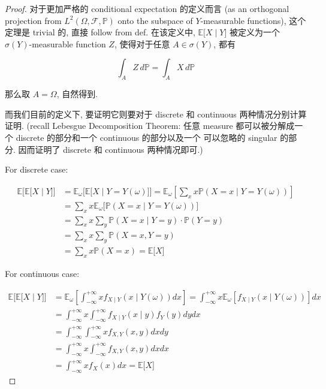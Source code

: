 \documentclass{qlnotes-export}
\begin{document}
\begin{proof}

对于更加严格的 conditional expectation 的定义而言 (as an orthogonal projection from \(L^{2}(\Omega,\mathcal{F},{\mathbb{P}})\) onto the subspace of \(Y\)-measurable functions), 这个定理是 trivial 的, 直接 follow from def. 在该定义中, \(\left. {\mathbb{E}}\lbrack X \middle| Y\rbrack \right.\) 被定义为一个 \(\sigma(Y)\)-measurable function \(Z\), 使得对于任意 \(A \in \sigma(Y)\), 都有

\[\int_{A}Z\, d{\mathbb{P}} = \int_{A}X\, d{\mathbb{P}}\]

那么取 \(A = \Omega\), 自然得到.

而我们目前的定义下, 要证明它则要对于 discrete 和 continuous 两种情况分别计算证明. (recall Lebesgue Decomposition Theorem: 任意 measure 都可以被分解成一个 discrete 的部分和一个 continuous 的部分以及一个 可以忽略的 singular 的部分. 因而证明了 discrete 和 continuous 两种情况即可.)

For discrete case:

\[\begin{matrix}
{{\mathbb{E}}\lbrack{\mathbb{E}}\lbrack X \mid Y\rbrack\rbrack} & {= {\mathbb{E}}_{\omega}\lbrack{\mathbb{E}}\lbrack X \mid Y = Y(\omega)\rbrack\rbrack = {\mathbb{E}}_{\omega}\left\lbrack {\sum\limits_{x}x{\mathbb{P}}(X = x \mid Y = Y(\omega))} \right\rbrack} \\
 & {= \sum\limits_{x}x{\mathbb{E}}_{\omega}\lbrack{\mathbb{P}}(X = x \mid Y = Y(\omega))\rbrack} \\
 & {= \sum\limits_{x}x\sum\limits_{y}{\mathbb{P}}(X = x \mid Y = y) \cdot {\mathbb{P}}(Y = y)} \\
 & {= \sum\limits_{x}x\sum\limits_{y}{\mathbb{P}}(X = x,Y = y)} \\
 & {= \sum\limits_{x}x{\mathbb{P}}(X = x) = {\mathbb{E}}\lbrack X\rbrack}
\end{matrix}\]

For continuous case:

\[\begin{matrix}
{{\mathbb{E}}\lbrack{\mathbb{E}}\lbrack X \mid Y\rbrack\rbrack} & {= {\mathbb{E}}_{\omega}\left\lbrack {\int_{- \infty}^{+ \infty}xf_{X \mid Y}(x \mid Y(\omega))dx} \right\rbrack = \int_{- \infty}^{+ \infty}x{\mathbb{E}}_{\omega}\left\lbrack {f_{X \mid Y}(x \mid Y(\omega))} \right\rbrack dx} \\
 & {= \int_{- \infty}^{+ \infty}x\int_{- \infty}^{+ \infty}f_{X \mid Y}(x \mid y)f_{Y}(y)dydx} \\
 & {= \int_{- \infty}^{+ \infty}\int_{- \infty}^{+ \infty}xf_{X,Y}(x,y)dxdy} \\
 & {= \int_{- \infty}^{+ \infty}x\int_{- \infty}^{+ \infty}f_{X,Y}(x,y)dxdx} \\
 & {= \int_{- \infty}^{+ \infty}xf_{X}(x)dx = {\mathbb{E}}\lbrack X\rbrack}
\end{matrix}\]

\end{proof}
\end{document}

